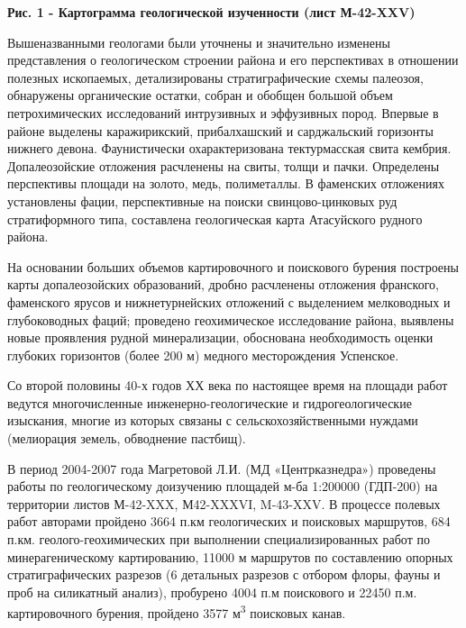 {\bfseries Рис. 1 - Картограмма геологической изученности (лист М-42-XXV)}

Вышеназванными геологами были уточнены и значительно изменены
представления о геологическом строении района и его перспективах в
отношении полезных ископаемых, детализированы стратиграфические схемы
палеозоя, обнаружены органические остатки, собран и обобщен большой
объем петрохимических исследований интрузивных и эффузивных пород.
Впервые в районе выделены каражирикский, прибалхашский и сарджальский
горизонты нижнего девона. Фаунистически охарактеризована тектурмасская
свита кембрия. Допалеозойские отложения расчленены на свиты, толщи и
пачки. Определены перспективы площади на золото, медь, полиметаллы. В
фаменских отложениях установлены фации, перспективные на поиски
свинцово-цинковых руд стратиформного типа, составлена геологическая
карта Атасуйского рудного района.

На основании больших объемов картировочного и поискового бурения
построены карты допалеозойских образований, дробно расчленены отложения
франского, фаменского ярусов и нижнетурнейских отложений с выделением
мелководных и глубоководных фаций; проведено геохимическое исследование
района, выявлены новые проявления рудной минерализации, обоснована
необходимость оценки глубоких горизонтов (более 200 м) медного
месторождения Успенское.

Со второй половины 40-х годов ХХ века по настоящее время на площади
работ ведутся многочисленные инженерно-геологические и
гидрогеологические изыскания, многие из которых связаны с
сельскохозяйственными нуждами (мелиорация земель, обводнение пастбищ).

В период 2004-2007 года Магретовой Л.И. (МД «Центрказнедра») проведены
работы по геологическому доизучению площадей м-ба 1:200000 (ГДП-200) на
территории листов М-42-XXX, М42-XXXVI, M-43-XXV. В процессе полевых
работ авторами пройдено 3664 п.км геологических и поисковых маршрутов,
684 п.км. геолого-геохимических при выполнении специализированных работ
по минерагеническому картированию, 11000 м маршрутов по составлению
опорных стратиграфических разрезов (6 детальных разрезов с отбором
флоры, фауны и проб на силикатный анализ), пробурено 4004 п.м поискового
и 22450 п.м. картировочного бурения, пройдено 3577 м\textsuperscript{3}
поисковых канав.

